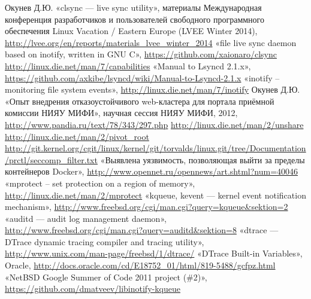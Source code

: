 \documentclass[10pt, a5paper]{article}
\begin{document}
\begin{thebibliography}{99}
   Окунев Д.Ю. «clsync — live sync utility», материалы Международная конференция разработчиков и пользователей свободного программного обеспечения Linux Vacation / Eastern Europe (LVEE Winter 2014), \url{http://lvee.org/en/reports/materials_lvee_winter_2014}
   «file live sync daemon based on inotify, written in GNU C», \url{https://github.com/xaionaro/clsync}
   \url{http://linux.die.net/man/7/capabilities}
   «Manual to Lsyncd 2.1.x», \url{https://github.com/axkibe/lsyncd/wiki/Manual-to-Lsyncd-2.1.x}
   «inotify – monitoring file system events», \url{http://linux.die.net/man/7/inotify}
   Окунев Д.Ю. «Опыт внедрения отказоустойчивого web-кластера для портала приёмной комиссии НИЯУ МИФИ», научная сессия НИЯУ МИФИ, 2012, \url{http://www.pandia.ru/text/78/343/297.php}
   \url{http://linux.die.net/man/2/unshare}
   \url{http://linux.die.net/man/2/pivot_root}
   \url{http://git.kernel.org/cgit/linux/kernel/git/torvalds/linux.git/tree/Documentation/prctl/seccomp_filter.txt}
   «Выявлена уязвимость, позволяющая выйти за пределы контейнеров Docker», \url{http://www.opennet.ru/opennews/art.shtml?num=40046}
   «mprotect -- set protection on a region of memory», \url{http://linux.die.net/man/2/mprotect}
   «kqueue, kevent — kernel event notification mechanism», \url{http://www.freebsd.org/cgi/man.cgi?query=kqueue&sektion=2}
   «auditd — audit log management daemon», \url{http://www.freebsd.org/cgi/man.cgi?query=auditd&sektion=8}
   «dtrace — DTrace dynamic tracing compiler and tracing utility», \url{http://www.unix.com/man-page/freebsd/1/dtrace/}
   «DTrace Built-in Variables», Oracle, \url{http://docs.oracle.com/cd/E18752_01/html/819-5488/gcfpz.html}
   «NetBSD Google Summer of Code 2011 project (\#2)», \url{https://github.com/dmatveev/libinotify-kqueue}
\end{thebibliography}
\end{document}
